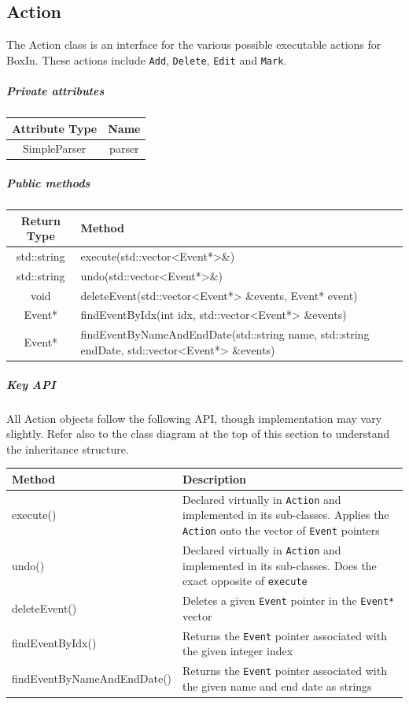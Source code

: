 \documentclass[12pt]{extarticle}
\begin{document}
\subsection{Action}
The Action class is an interface for the various possible executable actions for BoxIn. These actions include \texttt{Add}, \texttt{Delete}, \texttt{Edit} and \texttt{Mark}.\\

\subparagraph{Private attributes}
\begin{tabular}{c c}
Attribute Type & Name\\
\hline
SimpleParser & parser\\
\end{tabular}
\subparagraph{Public methods}
\begin{tabular}{c p{11cm}}
Return Type & Method\\
\hline
std::string & execute(std::vector<Event*>\&)\\
std::string & undo(std::vector<Event*>\&)\\
void & deleteEvent(std::vector<Event*> \&events, Event* event)\\
Event* & findEventByIdx(int idx, std::vector<Event*> \&events)\\
Event* & findEventByNameAndEndDate(std::string name, std::string endDate, std::vector<Event*> \&events)\\
\end{tabular}
\subparagraph{Key API}
All Action objects follow the following API, though implementation may vary slightly. Refer also to the class diagram at the top of this section to understand the inheritance structure.\\
\begin{tabular}{p{6cm} p{12cm}}
Method & Description\\
\hline
execute() & Declared virtually in \texttt{Action} and implemented in its sub-classes. Applies the \texttt{Action} onto the vector of \texttt{Event} pointers\\
undo() & Declared virtually in \texttt{Action} and implemented in its sub-classes. Does the exact opposite of \texttt{execute}\\
deleteEvent() & Deletes a given \texttt{Event} pointer in the \texttt{Event*} vector\\
findEventByIdx() & Returns the \texttt{Event} pointer associated with the given integer index\\
findEventByNameAndEndDate() & Returns the \texttt{Event} pointer associated with the given name and end date as strings\\
\end{tabular}
\end{document}
